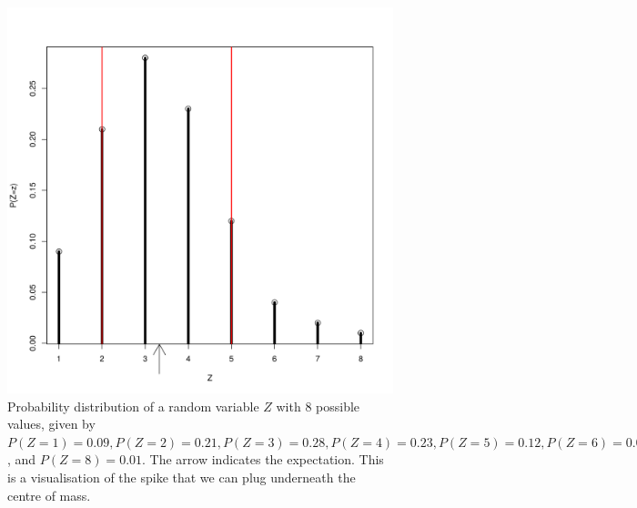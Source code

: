 \begin{figure}[t]
\center
\includegraphics[scale=.4]{distribution.png}
\caption{Probability distribution of a random variable $Z$ with $ 8 $ possible values, given by $ P(Z = 1) = 0.09,  P(Z = 2) = 0.21, P(Z = 3) = 0.28, P(Z = 4) = 0.23, P(Z = 5) = 0.12, P(Z = 6) = 0.04, P(Z = 7) = 0.02$, and $ P(Z = 8) = 0.01$. The arrow indicates the expectation. This is a visualisation of 
the spike that we can plug underneath the centre of mass.}
\label{binomplot}
\end{figure}

